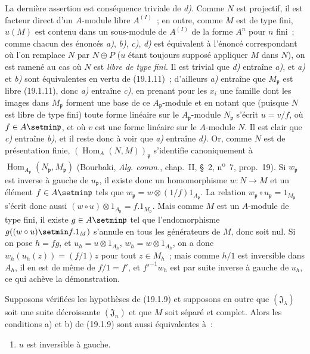 La dernière assertion est conséquence triviale de \emph{d)}. Comme $N$ est
projectif, il est facteur direct d'un $A$-module libre $A^{(I)}$~; en outre,
comme $M$ est de type fini, $u(M)$ est contenu dans un sous-module de $A^{(I)}$
de la forme $A^n$ pour $n$ fini~; comme chacun des énoncés \emph{a)}, \emph{b)}, \emph{c)}, \emph{d)} est
équivalent à l'énoncé correspondant où l'on remplace $N$ par $N\oplus P$ ($u$
étant toujours supposé appliquer $M$ dans $N$), on est ramené au cas où $N$
est \emph{libre de type fini}. Il est trivial que \emph{d)} entraîne \emph{a)}, et \emph{a)} et \emph{b)}
sont équivalentes en vertu de (19.1.11)~; d'ailleurs \emph{a)} entraîne que
$M_{\mathfrak p}$ est libre (19.1.11), donc \emph{a)} entraîne \emph{c)}, en prenant pour les
$x_i$ une famille dont les images dans $M_{\mathfrak p}$ forment une base de ce
$A_{\mathfrak p}$-module et en notant que (puisque $N$ est libre de type fini)
toute forme linéaire sur le $A_{\mathfrak p}$-module $N_{\mathfrak p}$ s'écrit
$u=v/f$, où $f\in A\setmin\mathfrak p$, et où $v$ est une forme linéaire sur le
$A$-module $N$. Il est clair que \emph{c)} entraîne \emph{b)}, et il reste donc à voir que \emph{a)}
entraîne \emph{d)}. Or, comme $N$ est de présentation finie,
$(\operatorname{Hom}_A(N,M))_{\mathfrak p}$ s'identifie canoniquement à
$\operatorname{Hom}_{A_{\mathfrak p}}(N_{\mathfrak p},M_{\mathfrak p})$
(Bourbaki, \emph{Alg. comm.}, chap.~II, §~2, n\textsuperscript{o}~7,
prop.~19). Si $w_{\mathfrak p}$ est inverse à gauche de $u_{\mathfrak p}$, il
existe donc un homomorphisme $w:N\to M$ et un élément $f\in A\setmin\mathfrak p$
tels que $w_{\mathfrak p}=w\otimes(1/f)1_{A_{\mathfrak p}}$. La relation
$w_{\mathfrak p}\circ u_{\mathfrak p}=1_{M_{\mathfrak p}}$ s'écrit donc aussi
$(w\circ u)\otimes1_{A_{\mathfrak p}}=f.1_{M_{\mathfrak p}}$. Mais comme $M$
est un $A$-module de type fini, il existe $g\in A\setmin\mathfrak p$ tel que
l'endomorphisme $g((w\circ u)\setmin f.1_M)$ s'annule en tous les générateurs de $M$,
donc soit nul. Si on pose $h=fg$, et
$u_h=u\otimes1_{A_h}$, $w_h=w\otimes1_{A_h}$, on a donc
$w_h(u_h(z))=(f/1)z$ pour tout $z\in M_h$~; mais comme $h/1$ est inversible
dans $A_h$, il en est de même de $f/1=f'$, et $f'^{-1}w_h$ est par suite
inverse à gauche de $u_h$, ce qui achève la démonstration.

\begin{proposition}[19.1.13]
\label{0.19.1.13-fr}
Supposons vérifiées les hypothèses de \textup{(19.1.9)} et supposons en outre que
$(\mathfrak J_\lambda)$ soit une suite décroissante $(\mathfrak J_n)$ et que
$M$ soit séparé et complet. Alors les conditions \textup{a)} et \textup{b)} de \textup{(19.1.9)} sont
aussi équivalentes à~:
\begin{enumerate}
  \item[\textup{c)}] $u$ est inversible à gauche.
\end{enumerate}
\end{proposition}

